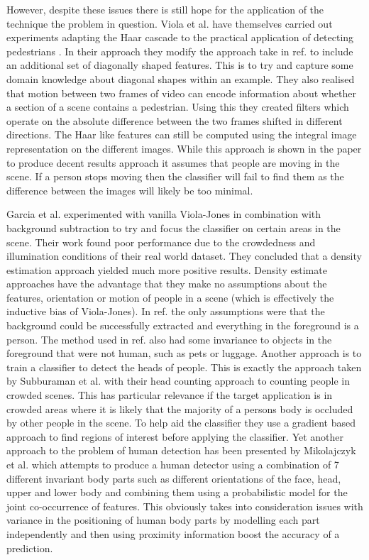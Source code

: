 \documentclass[conference]{IEEEtran}
\begin{document}
However, despite these issues there is still hope for the application of the technique the problem in question. Viola et al. have themselves carried out experiments adapting the Haar cascade to the practical application of detecting pedestrians \cite{viola2003detecting}. In their approach they modify the approach take in ref. \cite{viola2004robust} to include an additional set of diagonally shaped features. This is to try and capture some domain knowledge about diagonal shapes within an example. They also realised that motion between two frames of video can encode information about whether a section of a scene contains a pedestrian. Using this they created filters which operate on the absolute difference between the two frames shifted in different directions. The Haar like features can still be computed using the integral image representation on the different images. While this approach is shown in the paper to produce decent results approach it assumes that people are moving in the scene. If a person stops moving then the classifier will fail to find them as the difference between the images will likely be too minimal. 

Garcia et al. \cite{garcia2008effective} experimented with vanilla Viola-Jones in combination with background subtraction to try and focus the classifier on certain areas in the scene. Their work found poor performance due to the crowdedness and illumination conditions of their real world dataset. They concluded that a density estimation approach yielded much more positive results. Density estimate approaches have the advantage that they make no assumptions about the features, orientation or motion of people in a scene (which is effectively the inductive bias of Viola-Jones). In ref. \cite{garcia2008effective} the only assumptions were that the background could be successfully extracted and everything in the foreground is a person. The method used in ref. \cite{garcia2008effective} also had some invariance to objects in the foreground that were not human, such as pets or luggage. Another approach is to train a classifier to detect the heads of people. This is exactly the approach taken by Subburaman et al. \cite{subburaman2012counting} with their head counting approach to counting people in crowded scenes. This has particular relevance if the target application is in crowded areas where it is likely that the majority of a persons body is occluded by other people in the scene. To help aid the classifier they use a gradient based approach to find regions of interest before applying the classifier. Yet another approach to the problem of human detection has been presented by Mikolajczyk et al. \cite{mikolajczyk2004human} which attempts to produce a human detector using a combination of 7 different invariant body parts such as different orientations of the face, head, upper and lower body and combining them using a probabilistic model for the joint co-occurrence of features. This obviously takes into consideration issues with variance in the positioning of human body parts by modelling each part independently and then using proximity information boost the accuracy of a prediction.
\end{document}
